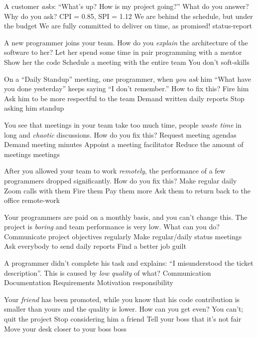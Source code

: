 \documentclass{article}
\begin{document}

\pmbaQuestion
  {A customer \emph{asks}: ``What's up? How is my project going?'' What do you answer?}
  {Why do you ask?}
  {CPI = 0.85, SPI = 1.12}
  {We are behind the schedule, but under the budget}
  {We are fully committed to deliver on time, as promised!}
  {status-report}

\pmbaQuestion
  {A new programmer joins your team. How do you \emph{explain} the architecture of the software to her?}
  {Let her spend some time in pair programming with a mentor}
  {Show her the code}
  {Schedule a meeting with the entire team}
  {You don't}
  {soft-skills}

\pmbaQuestion
  {On a ``Daily Standup'' meeting, one programmer, when \emph{you ask} him ``What have you done yesterday'' keeps saying ``I don't remember.'' How to fix this?}
  {Fire him}
  {Ask him to be more respectful to the team}
  {Demand written daily reports}
  {Stop asking him}
  {standup}

\pmbaQuestion
  {You see that meetings in your team take too much time, people \emph{waste time} in long and \emph{chaotic} discussions. How do you fix this?}
  {Request meeting agendas}
  {Demand meeting minutes}
  {Appoint a meeting facilitator}
  {Reduce the amount of meetings}
  {meetings}

\pmbaQuestion
  {After you allowed your team to work \emph{remotely}, the performance of a few programmers dropped significantly. How do you fix this?}
  {Make regular daily Zoom calls with them}
  {Fire them}
  {Pay them more}
  {Ask them to return back to the office}
  {remote-work}

\pmbaQuestion
  {Your programmers are paid on a monthly basis, and you can't change this. The project is \emph{boring} and team performance is very low. What can you do?}
  {Communicate project objectives regularly}
  {Make regular/daily status meetings}
  {Ask everybody to send daily reports}
  {Find a better job}
  {guilt}

\pmbaQuestion
  {A programmer didn't complete his task and explains: ``I misunderstood the ticket description''. This is caused by \emph{low quality} of what?}
  {Communication}
  {Documentation}
  {Requirements}
  {Motivation}
  {responsibility}

\pmbaQuestion
  {Your \emph{friend} has been promoted, while you know that his code contribution is smaller than yours and the quality is lower. How can you get even?}
  {You can't; quit the project}
  {Stop considering him a friend}
  {Tell your boss that it's not fair}
  {Move your desk closer to your boss}
  {boss}
\end{document}
